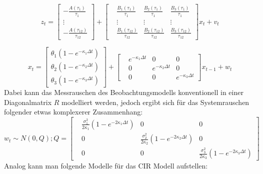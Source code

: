 \documentclass[12pt,a4paper,headsepline,bibliography=totoc,listof=totoc,headinclude=false,footinclude=false,BCOR5mm]{scrreprt} %
\begin{document}
\begin{equation}
z_{t} = \left[ \begin{array}{c} -\frac{A(\tau_{1})}{\tau_{1}} \\ \vdots \\  -\frac{A(\tau_{{12}})}{\tau_{{12}}} \end{array} \right] +  \begin{bmatrix} &\frac{B_1(\tau_{1})}{\tau_{1}} & \frac{B_2(\tau_{1})}{\tau_{1}} & \frac{B_3(\tau_{1})}{\tau_{1}}\\ &\vdots & \vdots& \vdots \\ &\frac{B_1(\tau_{{12}})}{\tau_{{12}}} & \frac{B_2(\tau_{{12}})}{\tau_{{12}}} &  \frac{B_3(\tau_{{12}})}{\tau_{{12}}} \end{bmatrix}  x_t  +  v_t 
\end{equation}

\begin{equation}
  x_t   = \left[ \begin{array}{c} \theta_1(1-e^{-\kappa_{1}\Delta t}) \\\theta_2(1-e^{-\kappa_{2}\Delta t}) \\  \theta_3(1-e^{-\kappa_{3}\Delta t}) \end{array} \right] +  \begin{bmatrix} &e^{-\kappa_{1}\Delta t} & 0 & 0\\ &0 & e^{-\kappa_{2}\Delta t}&0  \\ &0 &0 &  e^{-\kappa_{3}\Delta t} \end{bmatrix}   x_{t-1}   +  w_t 
\end{equation}
Dabei kann das Messrauschen des Beobachtungsmodells konventionell in einer Diagonalmatrix $R$ modelliert werden, jedoch ergibt sich f{\"u}r das Systemrauschen folgender etwas komplexerer Zusammenhang:
\begin{equation}
w_t  \sim N(0,Q); Q =  \begin{bmatrix} &\frac{\sigma^{2}_{1}}{2\kappa_{1}} (1- e^{-2\kappa_{1}\Delta t}) & 0 & 0\\ &0 & \frac{\sigma^{2}_{2}}{2\kappa_{2}} (1- e^{-2\kappa_{2}\Delta t}) &0  \\ &0 &0 &\frac{\sigma^{2}_{3}}{2\kappa_{3}} (1- e^{-2\kappa_{3}\Delta t})  \end{bmatrix}   
\end{equation}
Analog kann man folgende Modelle f{\"u}r das CIR Modell aufstellen:
\end{document}
